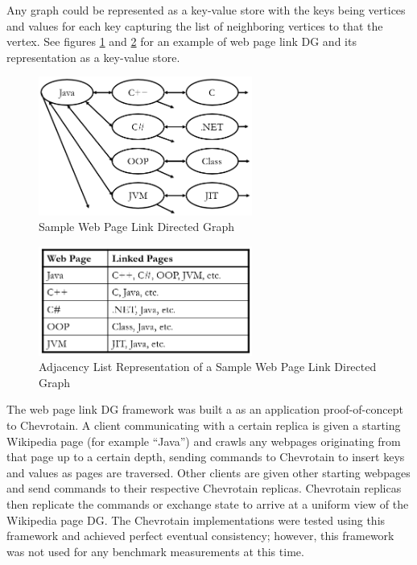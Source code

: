 \documentclass[sigconf,nonacm,10pt]{acmart}
\begin{document}
Any graph could be represented as a key-value store with the keys being vertices and values for each key capturing the list of neighboring vertices to that the vertex. See figures \ref{fig:wiki1} and \ref{fig:wiki2} for an example of web page link DG and its representation as a key-value store.

\begin{figure}[h]
  \centering
  \includegraphics[width=7cm]{Fig14Wiki1}
  \caption{Sample Web Page Link Directed Graph}
  \label{fig:wiki1}
\end{figure}

\begin{figure}[h]
  \centering
  \includegraphics[width=7cm]{Fig15Wiki2}
  \caption{Adjacency List Representation of a Sample Web Page Link Directed Graph}
  \label{fig:wiki2}
\end{figure}

The web page link DG framework was built a as an application proof-of-concept to Chevrotain. A client communicating with a certain replica is given a starting Wikipedia page (for example ``Java'') and crawls any webpages originating from that page up to a certain depth, sending commands to Chevrotain to insert keys and values as pages are traversed. Other clients are given other starting webpages and send commands to their respective Chevrotain replicas. Chevrotain replicas then replicate the commands or exchange state to arrive at a uniform view of the Wikipedia page DG. The Chevrotain implementations were tested using this framework and achieved perfect eventual consistency; however, this framework was not used for any benchmark measurements at this time.
\end{document}
